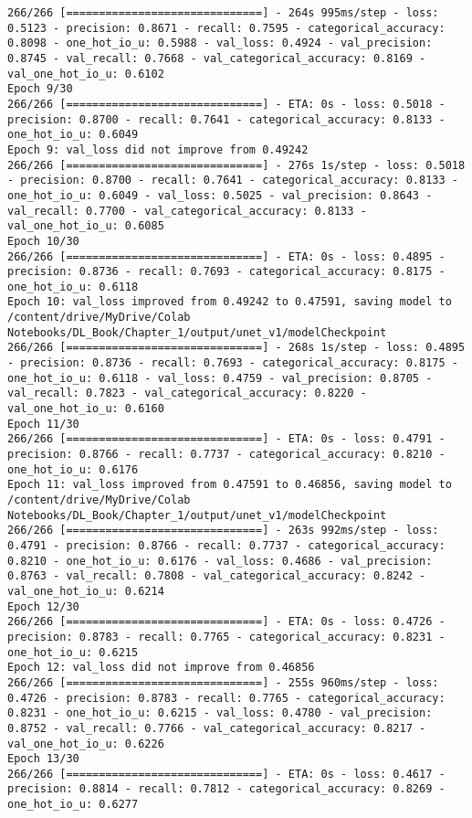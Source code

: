 \documentclass[
  letterpaper,
  DIV=11,
  numbers=noendperiod]{scrreprt}
\begin{document}
\begin{verbatim}
266/266 [==============================] - 264s 995ms/step - loss: 0.5123 - precision: 0.8671 - recall: 0.7595 - categorical_accuracy: 0.8098 - one_hot_io_u: 0.5988 - val_loss: 0.4924 - val_precision: 0.8745 - val_recall: 0.7668 - val_categorical_accuracy: 0.8169 - val_one_hot_io_u: 0.6102
Epoch 9/30
266/266 [==============================] - ETA: 0s - loss: 0.5018 - precision: 0.8700 - recall: 0.7641 - categorical_accuracy: 0.8133 - one_hot_io_u: 0.6049
Epoch 9: val_loss did not improve from 0.49242
266/266 [==============================] - 276s 1s/step - loss: 0.5018 - precision: 0.8700 - recall: 0.7641 - categorical_accuracy: 0.8133 - one_hot_io_u: 0.6049 - val_loss: 0.5025 - val_precision: 0.8643 - val_recall: 0.7700 - val_categorical_accuracy: 0.8133 - val_one_hot_io_u: 0.6085
Epoch 10/30
266/266 [==============================] - ETA: 0s - loss: 0.4895 - precision: 0.8736 - recall: 0.7693 - categorical_accuracy: 0.8175 - one_hot_io_u: 0.6118
Epoch 10: val_loss improved from 0.49242 to 0.47591, saving model to /content/drive/MyDrive/Colab Notebooks/DL_Book/Chapter_1/output/unet_v1/modelCheckpoint
266/266 [==============================] - 268s 1s/step - loss: 0.4895 - precision: 0.8736 - recall: 0.7693 - categorical_accuracy: 0.8175 - one_hot_io_u: 0.6118 - val_loss: 0.4759 - val_precision: 0.8705 - val_recall: 0.7823 - val_categorical_accuracy: 0.8220 - val_one_hot_io_u: 0.6160
Epoch 11/30
266/266 [==============================] - ETA: 0s - loss: 0.4791 - precision: 0.8766 - recall: 0.7737 - categorical_accuracy: 0.8210 - one_hot_io_u: 0.6176
Epoch 11: val_loss improved from 0.47591 to 0.46856, saving model to /content/drive/MyDrive/Colab Notebooks/DL_Book/Chapter_1/output/unet_v1/modelCheckpoint
266/266 [==============================] - 263s 992ms/step - loss: 0.4791 - precision: 0.8766 - recall: 0.7737 - categorical_accuracy: 0.8210 - one_hot_io_u: 0.6176 - val_loss: 0.4686 - val_precision: 0.8763 - val_recall: 0.7808 - val_categorical_accuracy: 0.8242 - val_one_hot_io_u: 0.6214
Epoch 12/30
266/266 [==============================] - ETA: 0s - loss: 0.4726 - precision: 0.8783 - recall: 0.7765 - categorical_accuracy: 0.8231 - one_hot_io_u: 0.6215
Epoch 12: val_loss did not improve from 0.46856
266/266 [==============================] - 255s 960ms/step - loss: 0.4726 - precision: 0.8783 - recall: 0.7765 - categorical_accuracy: 0.8231 - one_hot_io_u: 0.6215 - val_loss: 0.4780 - val_precision: 0.8752 - val_recall: 0.7766 - val_categorical_accuracy: 0.8217 - val_one_hot_io_u: 0.6226
Epoch 13/30
266/266 [==============================] - ETA: 0s - loss: 0.4617 - precision: 0.8814 - recall: 0.7812 - categorical_accuracy: 0.8269 - one_hot_io_u: 0.6277

\end{verbatim}
\end{document}
